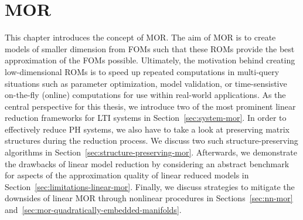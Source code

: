 \chapter{\acl{MOR}}\label{chap:linear-mor}

This chapter introduces the concept of \acf{MOR}.
The aim of MOR is to create models of smaller dimension from \acfp{FOM} such that these \acfp{ROM} provide the best approximation of the \acp{FOM} possible.
Ultimately, the motivation behind creating low-dimensional ROMs is to speed up repeated computations in multi-query situations such as parameter optimization, model validation, or time-sensistive on-the-fly (online) computations for use within real-world applications.
As the central perspective for this thesis, we introduce two of the most prominent linear reduction frameworks for \ac{LTI} systems in Section~\ref{sec:system-mor}.
In order to effectively reduce \ac{PH} systems, we also have to take a look at preserving matrix structures during the reduction process.
We discuss two such structure-preserving algorithms in Section~\ref{sec:structure-preserving-mor}.
Afterwards, we demonstrate the drawbacks of linear model reduction by considering an abstract benchmark for aspects of the approximation quality of linear reduced models in Section~\ref{sec:limitations-linear-mor}.
Finally, we discuss strategies to mitigate the downsides of linear \ac{MOR} through nonlinear procedures in Sections~\ref{sec:nn-mor} and~\ref{sec:mor-quadratically-embedded-manifolds}.






